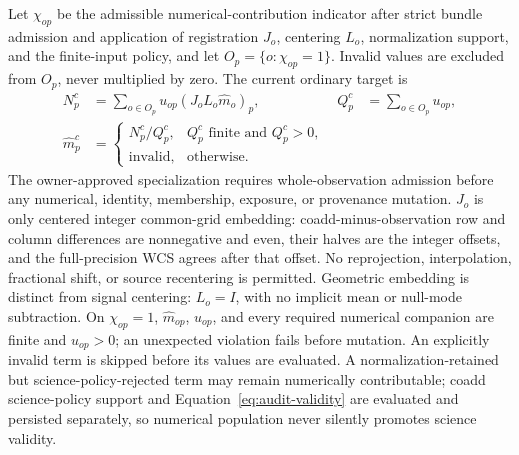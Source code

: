 \documentclass[11pt]{article}
\begin{document}
Let \(\chi_{op}\) be the admissible numerical-contribution indicator after
strict bundle admission and application of registration \(J_o\), centering
\(L_o\), normalization support, and the finite-input policy, and let
\(O_p=\{o:\chi_{op}=1\}\).  Invalid values are excluded from \(O_p\), never
multiplied by zero.  The current ordinary target is
\begin{align}
 N^{c}_p &= \sum_{o\in O_p}u_{op}(J_oL_o\widehat m_o)_p,
 &Q^{c}_p &= \sum_{o\in O_p}u_{op},
 \label{eq:audit-coadd-num}\\
 \widehat m^{c}_p&=\begin{cases}
   N^{c}_p/Q^{c}_p,&Q^{c}_p\text{ finite and }Q^{c}_p>0,\\
   \text{invalid},&\text{otherwise}.
 \end{cases}
 \label{eq:audit-coadd-map}
\end{align}
The owner-approved specialization requires whole-observation admission before
any numerical, identity, membership, exposure, or provenance mutation.
\(J_o\) is only centered integer common-grid embedding: coadd-minus-observation
row and column differences are nonnegative and even, their halves are the
integer offsets, and the full-precision WCS agrees after that offset.  No
reprojection, interpolation, fractional shift, or source recentering is
permitted.  Geometric embedding is distinct from signal centering:
\(L_o=I\), with no implicit mean or null-mode subtraction.  On
\(\chi_{op}=1\), \(\widehat m_{op}\), \(u_{op}\), and every required numerical
companion are finite and \(u_{op}>0\); an unexpected violation fails before
mutation.  An explicitly invalid term is skipped before its values are
evaluated.  A normalization-retained but science-policy-rejected term may
remain numerically contributable; coadd science-policy support and
Equation~\eqref{eq:audit-validity} are evaluated and persisted separately, so
numerical population never silently promotes science validity.
\end{document}
